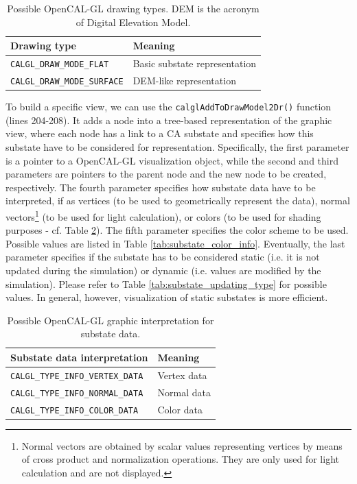 \begin{table}
  \centering
  \footnotesize
  \begin{tabular}{l|l}
    \hline
    Drawing type & Meaning \\
    \hline
    \verb'CALGL_DRAW_MODE_FLAT'    & Basic substate representation \\
    \verb'CALGL_DRAW_MODE_SURFACE' & DEM-like representation \\
    \hline
  \end{tabular}
  \caption{Possible OpenCAL-GL drawing types. DEM is the acronym of Digital Elevation Model.}
  \label{tab:draw_modes}
\end{table}

To build a specific view, we can use the
\verb'calglAddToDrawModel2Dr()' function (lines 204-208). It adds a
node into a tree-based representation of the graphic view, where each
node has a link to a CA substate and specifies how this substate have
to be considered for representation. Specifically, the first parameter
is a pointer to a OpenCAL-GL visualization object, while the second
and third parameters are pointers to the parent node and the new node
to be created, respectively. The fourth parameter specifies how
substate data have to be interpreted, if as vertices (to be used to
geometrically represent the data), normal vectors\footnote{Normal
  vectors are obtained by scalar values representing vertices by means
  of cross product and normalization operations. They are only used
  for light calculation and are not displayed.} (to be used for light
calculation), or colors (to be used for shading purposes - cf. Table
\ref{tab:substate_type_info}). The fifth parameter specifies the color
scheme to be used. Possible values are listed in Table
\ref{tab:substate_color_info}. Eventually, the last parameter
specifies if the substate has to be considered static (i.e. it is not
updated during the simulation) or dynamic (i.e. values are modified by
the simulation). Please refer to Table
\ref{tab:substate_updating_type} for possible values. In general,
however, visualization of static substates is more efficient.

\begin{table}
  \centering
  \small
  \begin{tabular}{l|l}
    \hline
    Substate data interpretation & Meaning\\
    \hline
    \verb'CALGL_TYPE_INFO_VERTEX_DATA' & Vertex data\\
    \verb'CALGL_TYPE_INFO_NORMAL_DATA' & Normal data\\
    \verb'CALGL_TYPE_INFO_COLOR_DATA'  & Color data\\
    \hline
  \end{tabular}
  \caption{Possible OpenCAL-GL graphic interpretation for substate data.}
  \label{tab:substate_type_info}
\end{table}


